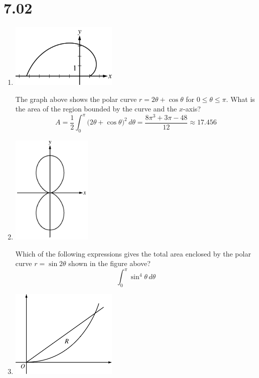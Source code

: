 \documentclass[12pt]{article}
\begin{document}
\section*{7.02}
\begin{enumerate}
	\item 
	      \begin{center}
	      	\includegraphics[width = 2in]{7.021}
	      \end{center}
	      The graph above shows the polar curve $r=2\theta + \cos\theta$ for $0\leq\theta\leq\pi$. What is the area of the region bounded by the curve and the $x$-axis?
	      $$A=\frac{1}{2} \int_{0}^{\pi} \big(2\theta + \cos\theta\big)^2\, d\theta = \frac{8\pi^3+3\pi-48}{12} \approx \boxed{17.456}$$
	\item 
	      \begin{center}
	      	\includegraphics[width = 1.5in]{7.022}
	      \end{center}
	      Which of the following expressions gives the total area enclosed by the polar curve $r=\sin2\theta$ shown in the figure above?
	      $$\boxed{\int_{0}^{\pi} \sin^4 \theta \, d\theta}$$
	\item 
	      \begin{center}
	      	\includegraphics[width=2in]{7.023.png}

\end{center}
\end{enumerate}
\end{document}
